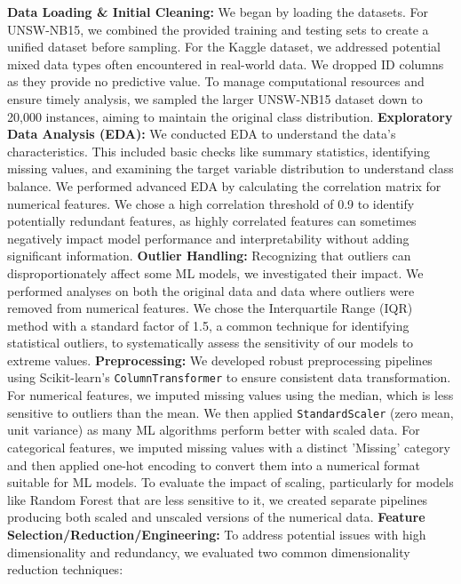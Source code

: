\documentclass[sigconf,screen,final,nonacm]{acmart}
\newcommand{\circled}[1]{%
  \tikz[baseline=(char.base)]{
    \node[shape=circle, fill=black, text=white, inner sep=1pt, minimum size=1.5em] (char) {#1};
  }%
}
\begin{document}
    \circled{1} \textbf{Data Loading \& Initial Cleaning:} We began by loading the datasets. For UNSW-NB15, we combined the provided training and testing sets to create a unified dataset before sampling. For the Kaggle dataset, we addressed potential mixed data types often encountered in real-world data. We dropped ID columns as they provide no predictive value. To manage computational resources and ensure timely analysis, we sampled the larger UNSW-NB15 dataset down to 20,000 instances, aiming to maintain the original class distribution.
    \circled{2} \textbf{Exploratory Data Analysis (EDA):} We conducted EDA to understand the data's characteristics. This included basic checks like summary statistics, identifying missing values, and examining the target variable distribution to understand class balance. We performed advanced EDA by calculating the correlation matrix for numerical features. We chose a high correlation threshold of 0.9 to identify potentially redundant features, as highly correlated features can sometimes negatively impact model performance and interpretability without adding significant information.
    \circled{3} \textbf{Outlier Handling:} Recognizing that outliers can disproportionately affect some ML models, we investigated their impact. We performed analyses on both the original data and data where outliers were removed from numerical features. We chose the Interquartile Range (IQR) method with a standard factor of 1.5, a common technique for identifying statistical outliers, to systematically assess the sensitivity of our models to extreme values.
    \circled{4} \textbf{Preprocessing:} We developed robust preprocessing pipelines using Scikit-learn's \texttt{ColumnTransformer} to ensure consistent data transformation. For numerical features, we imputed missing values using the median, which is less sensitive to outliers than the mean. We then applied \texttt{StandardScaler} (zero mean, unit variance) as many ML algorithms perform better with scaled data. For categorical features, we imputed missing values with a distinct 'Missing' category and then applied one-hot encoding to convert them into a numerical format suitable for ML models. To evaluate the impact of scaling, particularly for models like Random Forest that are less sensitive to it, we created separate pipelines producing both scaled and unscaled versions of the numerical data.
    \circled{5} \textbf{Feature Selection/Reduction/Engineering:} To address potential issues with high dimensionality and redundancy, we evaluated two common dimensionality reduction techniques:
\end{document}
